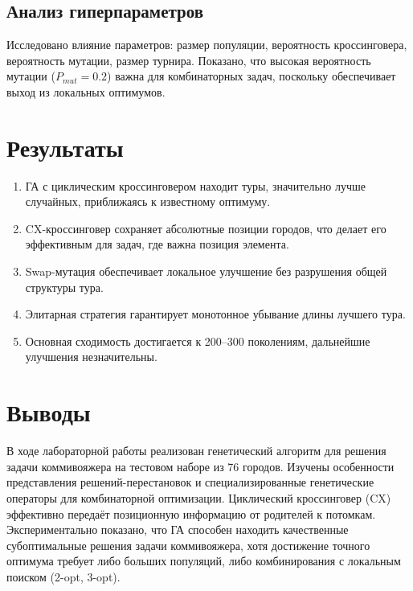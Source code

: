 \documentclass[14pt,a4paper]{extarticle}
\begin{document}
\subsection{Анализ гиперпараметров}

Исследовано влияние параметров: размер популяции, вероятность кроссинговера, вероятность мутации, размер турнира. Показано, что высокая вероятность мутации ($P_{mut} = 0.2$) важна для комбинаторных задач, поскольку обеспечивает выход из локальных оптимумов.

\section{Результаты}

\begin{enumerate}
\item ГА с циклическим кроссинговером находит туры, значительно лучше случайных, приближаясь к известному оптимуму.
\item CX-кроссинговер сохраняет абсолютные позиции городов, что делает его эффективным для задач, где важна позиция элемента.
\item Swap-мутация обеспечивает локальное улучшение без разрушения общей структуры тура.
\item Элитарная стратегия гарантирует монотонное убывание длины лучшего тура.
\item Основная сходимость достигается к 200--300 поколениям, дальнейшие улучшения незначительны.
\end{enumerate}



\section{Выводы}

В ходе лабораторной работы реализован генетический алгоритм для решения задачи коммивояжера на тестовом наборе из 76 городов. Изучены особенности представления решений-перестановок и специализированные генетические операторы для комбинаторной оптимизации. Циклический кроссинговер (CX) эффективно передаёт позиционную информацию от родителей к потомкам. Экспериментально показано, что ГА способен находить качественные субоптимальные решения задачи коммивояжера, хотя достижение точного оптимума требует либо бо\textasciiacute{}льших популяций, либо комбинирования с локальным поиском (2-opt, 3-opt).


\end{document}
